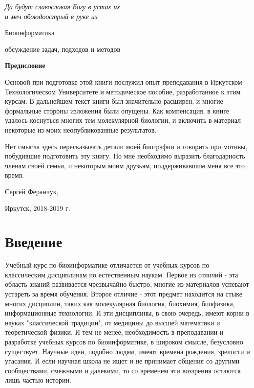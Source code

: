 \documentclass[a4paper,12pt,oneside,openany]{memoir}
\begin{document}
\thispagestyle{empty}
\vskip 36pt
\bigskip 
\begin{flushright}\emfont \itshape \small Да будут славословия Богу в устах их\\и меч обоюдоострый в руке их\\ \end{flushright} 
\vskip 240pt
\begin{center}
\begin{Huge}
\cyrillicfontsf
Биоинформатика
\end{Huge}
\vskip 24pt
\begin{Large}
\cyrillicfontsf
обсуждение задач, подходов и методов
\end{Large}
\end{center}
\vskip 240pt
\newpage
\textbf{Предисловие}

Основой при подготовке этой книги послужил опыт преподавания в Иркутском Технологическом Университете и методическое пособие, разработанное к этим курсам. В дальнейшем текст книги был значительно расширен, и многие формальные стороны изложения  были опущены. Как компенсация, в книге удалось коснуться многих тем молекулярной биологии, и включить в материал некоторые из моих неопубликованные результатов.

Нет смысла здесь пересказывать детали моей биографии и говорить про мотивы, побудившие подготовить эту книгу. Но мне необходимо выразить благодарность членам своей семьи, и некоторым моим друзьям, поддерживавшим меня все это время.

Сергей Феранчук,

Иркутск, 2018-2019 г.
\newpage
\setcounter{tocdepth}{2}
\tableofcontents*

\chapter{Введение} \label{introduction}

Учебный курс по биоинформатике отличается от учебных курсов по классическим дисциплинам по естественным наукам. Первое из отличий - эта область знаний развивается чрезвычайно быстро, многие из материалов успевают устареть за время обучения. Второе отличие - этот предмет находится на стыке многих дисциплин, таких как молекулярная биология, биохимия, биофизика, информационные технологии. И эти дисциплины, в свою очередь, имеют корни в науках "классической традиции", от медицины до высшей математики и теоретической физики. И тем не менее, необходимость в преподавании и разработке учебных курсов по биоинформатике, в широком смысле, безусловно существует. Научные идеи, подобно людям, имеют времена рождения, зрелости и угасания. И если научная школа не ищет и не принимает общения со другими сообществами, смежными и далекими, то со временем эти воззрения остаются лишь частью истории.
\end{document}
